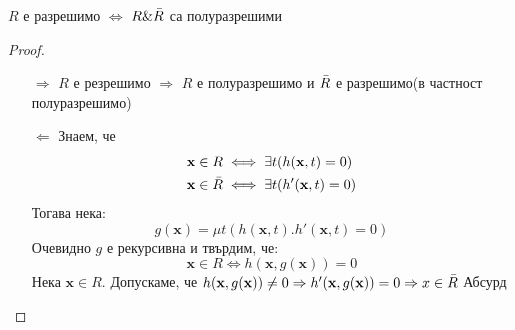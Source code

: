 \begin{theorem}[Пост]\label{thm:Post}
    $R$ е разрешимо $\iff$ $R \& \Bar{R}$ са полуразрешими
\end{theorem}
\begin{proof}
    \begin{itemize}
        \item[$\Rightarrow$] $R$ е резрешимо $\Rightarrow$ $R$ е полуразрешимо и $\Bar{R}$ е разрешимо(в частност полуразрешимо)
        \item[$\Leftarrow$] Знаем, че
        \begin{equation*}
            \begin{split}
                & \textbf{x} \in R \iff \exists t( h(\textbf{x},t) = 0 )\\
                & \textbf{x} \in \Bar{R} \iff \exists t( h'(\textbf{x},t) = 0 )
            \end{split}
        \end{equation*}
        Тогава нека:
        \begin{equation*}
            g(\textbf{x}) = \mu t ( h(\textbf{x},t).h'(\textbf{x}, t) = 0 )
        \end{equation*}
        Очевидно $g$ е рекурсивна и твърдим, че:
        \begin{equation*}
            \textbf{x} \in R \iff h(\textbf{x}, g(\textbf{x})) = 0
        \end{equation*}
        Нека $\textbf{x} \in R$. Допускаме, че $h(\textbf{x}, g(\textbf{x})) \neq 0 \Rightarrow h'(\textbf{x}, g(\textbf{x})) = 0 \Rightarrow x \in \Bar{R}$ Абсурд
    \end{itemize}
\end{proof}
